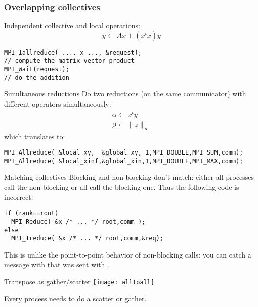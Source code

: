 
\begin{frame}[containsverbatim]\frametitle{Overlapping collectives}
  \label{sl:coll-nonblock-overlap}
  Independent collective and local operations:
\[ y \leftarrow Ax + (x^tx)y \]
\begin{lstlisting}
MPI_Iallreduce( .... x ..., &request);
// compute the matrix vector product
MPI_Wait(request);
// do the addition
\end{lstlisting}
\end{frame}

\begin{frame}[containsverbatim]{Simultaneous reductions}
  \label{sl:coll-nonblock-simult}
  Do two reductions (on the same communicator) with different
  operators simultaneously:
  \[ 
  \begin{array}{l}
    \alpha\leftarrow x^ty\\
    \beta\leftarrow \|z\|_\infty
  \end{array}
  \]
which translates to:
\begin{lstlisting}
MPI_Allreduce( &local_xy,  &global_xy, 1,MPI_DOUBLE,MPI_SUM,comm);
MPI_Allreduce( &local_xinf,&global_xin,1,MPI_DOUBLE,MPI_MAX,comm);
\end{lstlisting}
\end{frame}

\begin{exerciseframe}[procgridnonblock]
  \label{sl:coll-nonblock-exgrid}
  \hyperlink{ex:rowcolcomm}{}

  
\end{exerciseframe}

\begin{frame}[containsverbatim]{Matching collectives}
  \label{sl:coll-nonblock-match}
  Blocking and non-blocking don't match: either all processes
  call the non-blocking or all call the blocking one.
  Thus the following code is incorrect:
\begin{lstlisting}
if (rank==root)
  MPI_Reduce( &x /* ... */ root,comm );
else
  MPI_Ireduce( &x /* ... */ root,comm,&req);
\end{lstlisting}
  This is unlike the point-to-point behavior of non-blocking calls:
  you can catch a message with 
  that was sent with .
\end{frame}

\begin{frame}{Transpose as gather/scatter}
  \texttt{[image: alltoall]}

  Every process needs to do a scatter or gather.
\end{frame}

